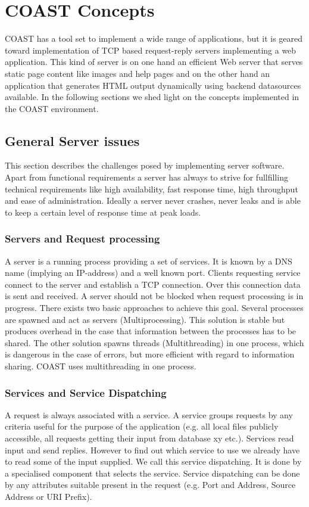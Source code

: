\section{COAST Concepts}
COAST has a tool set to implement a wide range of applications, but it is
geared toward implementation of TCP based request-reply servers implementing a
web application. This kind of server is on one hand an efficient Web server that
serves static page content like images and help pages and on the other hand an
application that generates HTML output dynamically using backend datasources
available. In the following sections we shed light on the concepts implemented
in the COAST environment.

\subsection{General Server issues}
This section describes the challenges posed by implementing server software.
Apart from functional requirements a server has always to strive for fullfilling
technical requirements like high availability, fast response time, high
throughput and ease of administration. Ideally a server never crashes, never
leaks and is able to keep a certain level of response time at peak loads.

\subsubsection{Servers and Request processing}
A server is a running process providing a set of services. It is known by a DNS
name (implying an IP-address) and a well known port. Clients requesting service
connect to the server and establish a TCP connection. Over this connection data
is sent and received. A server should not be blocked when request processing is
in progress. There exists two basic approaches to achieve this goal. Several
processes are spawned and act as servers (Multiprocessing). This solution is
stable but produces overhead in the case that information between the processes
has to be shared. The other solution spawns threads (Multithreading) in one
process, which is dangerous in the case of errors, but more efficient with
regard to information sharing. COAST uses multithreading in one process.

\subsubsection{Services and Service Dispatching}
A request is always associated with a service. A service groups requests by any
criteria useful for the purpose of the application (e.g. all local files
publicly accessible, all requests getting their input from database xy etc.).
Services read input and send replies. However to find out which service to use
we already have to read some of the input supplied. We call this service
dispatching. It is done by a specialised component that selects the service.
Service dispatching can be done by any attributes suitable present in the
request (e.g. Port and Address, Source Address or URI Prefix).

